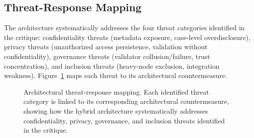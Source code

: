 \subsection{Threat-Response Mapping}\label{subsec:threats}

The architecture systematically addresses the four threat categories identified in the critique: confidentiality threats (metadata exposure, case-level overdisclosure), privacy threats (unauthorized access persistence, validation without confidentiality), governance threats (validator collusion/failure, trust concentration), and inclusion threats (heavy-node exclusion, integration weakness). Figure~\ref{fig:threats} maps each threat to its architectural countermeasure.

\begin{figure}[!ht]
\centering
{}
\caption{Architectural threat-response mapping. Each identified threat category is linked to its corresponding architectural countermeasure, showing how the hybrid architecture systematically addresses confidentiality, privacy, governance, and inclusion threats identified in the critique.}\label{fig:threats}
\end{figure}

%
%
%
%


